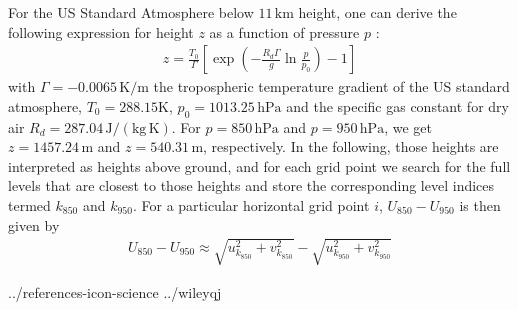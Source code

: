 \documentclass[a4paper,11pt]{article}
\begin{document}
For the US Standard Atmosphere below $11\,\mathrm{km}$ height, one can derive the following expression for height $z$ as a function of pressure 
$p$ \citep{USStandard:1976}:
\begin{align}
 z = \frac{T_{0}}{\Gamma}\left[\exp{\left(-\frac{R_{d}\Gamma}{g}\ln\frac{p}{p_{0}}\right)-1}\right]
\end{align}
with $\Gamma=-0.0065\, \mathrm{K/m}$ the tropospheric temperature gradient of the US standard atmosphere, $T_{0}=288.15\mathrm{K}$, $p_{0}=1013.25\,\mathrm{hPa}$ and the specific 
gas constant for dry air $R_{d}=287.04\,\mathrm{J/(kg\,K)}$. For $p=850\,\mathrm{hPa}$ and $p=950\,\mathrm{hPa}$, we get $z=1457.24\,\mathrm{m}$ and $z=540.31\,\mathrm{m}$, 
respectively. In the following, those heights are interpreted as heights above ground, and for each grid point we search for the full levels that are closest to those heights 
and store the corresponding level indices termed $k_{850}$ and $k_{950}$. For a particular horizontal grid point $i$, $U_{850} - U_{950}$ is then given by
\begin{align}
 U_{850} - U_{950} \approx \sqrt{u_{k_{850}}^2 + v_{k_{850}}^2} - \sqrt{u_{k_{950}}^2 + v_{k_{950}}^2}
\end{align}
 




 {../references-icon-science}
 {../wileyqj} %
\end{document}

